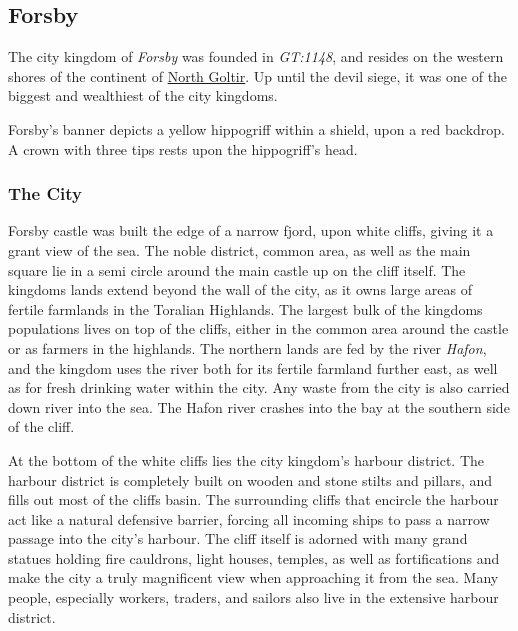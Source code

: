 \subsection{Forsby}
\label{sec:Forsby}


The city kingdom of \emph{Forsby} was founded in \emph{GT:1148}, and resides
on the western shores of the continent of \hyperref[sec:Goltir]{North Goltir}.
Up until the devil siege, it was one of the biggest and wealthiest of the city
kingdoms.

Forsby's banner depicts a yellow hippogriff within a shield, upon a red
backdrop. A crown with three tips rests upon the hippogriff's head.

\subsubsection{The City}

Forsby castle was built the edge of a narrow fjord, upon white cliffs, giving
it a grant view of the sea. The noble district, common area, as well as the
main square lie in a semi circle around the main castle up on the cliff
itself. The kingdoms lands extend beyond the wall of the city, as it owns
large areas of fertile farmlands in the Toralian Highlands. The largest
bulk of the kingdoms populations lives on top of the cliffs, either in the
common area around the castle or as farmers in the highlands. The northern
lands are fed by the river \emph{Hafon}, and the kingdom uses the river both
for its fertile farmland further east, as well as for fresh drinking water
within the city. Any waste from the city is also carried down river into the
sea. The Hafon river crashes into the bay at the southern side of the cliff.

At the bottom of the white cliffs lies the city kingdom's harbour district. The
harbour district is completely built on wooden and stone stilts and pillars,
and fills out most of the cliffs basin. The surrounding cliffs that encircle
the harbour act like a natural defensive barrier, forcing all incoming ships
to pass a narrow passage into the city's harbour. The cliff itself is adorned
with many grand statues holding fire cauldrons, light houses, temples, as well
as fortifications and make the city a truly magnificent view when approaching
it from the sea. Many people, especially workers, traders, and sailors also
live in the extensive harbour district.

